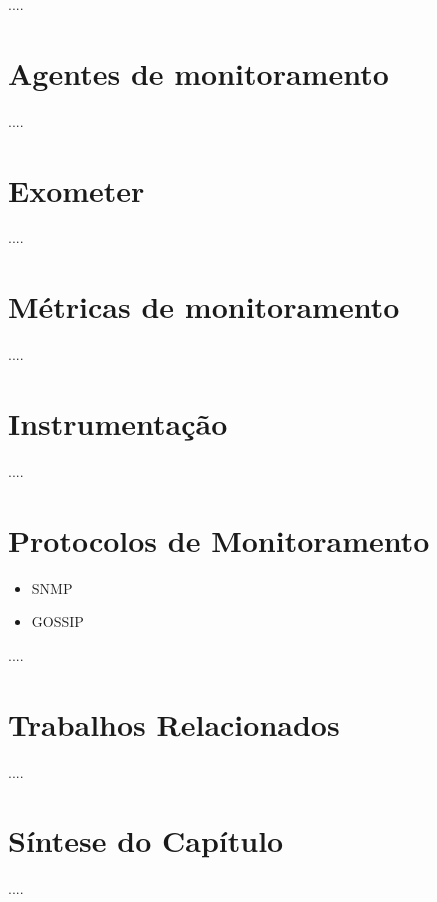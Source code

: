 ....


\section{Agentes de monitoramento}

....


\section{Exometer}

....


\section{Métricas de monitoramento}

....


\section{Instrumentação}

....


\section{Protocolos de Monitoramento}
\begin{itemize}
\item SNMP
\item GOSSIP
\end{itemize}
....


\section{Trabalhos Relacionados}

....


\section{Síntese do Capítulo}

....

